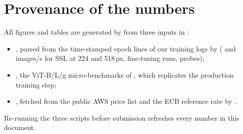 \documentclass[11pt,a4paper]{article}
\begin{document}
\section{Provenance of the numbers}
All figures and tables are generated by  from three inputs in :
\begin{itemize}
\item {}, parsed from the time-stamped epoch lines of our training logs by  (\ImgsTwoTwoFour{} and \ImgsFiveOneEight{} images/s for SSL at 224 and 518\,px, \PtwoRuns{} fine-tuning runs, \ProbeRuns{} probes);
\item {}, the ViT-B/L/g micro-benchmarks of , which replicates the production training step;
\item {}, fetched from the public AWS price list and the ECB reference rate by .
\end{itemize}
Re-running the three scripts before submission refreshes every number in this document.
\end{document}
